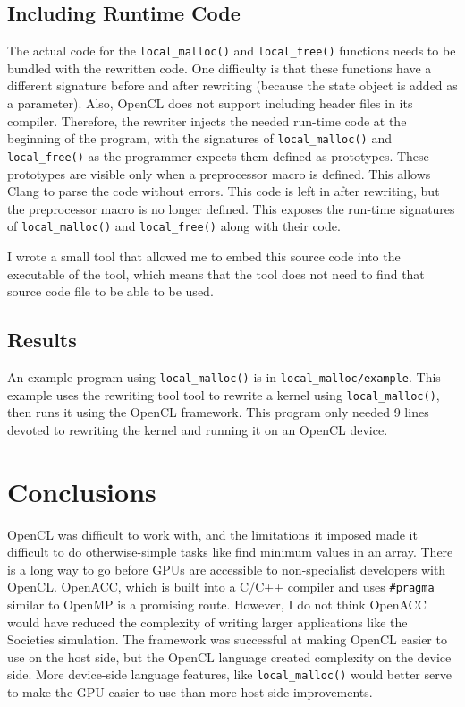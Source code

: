\documentclass{article}
\begin{document}
\subsection{Including Runtime Code}
The actual code for the \texttt{local\_malloc()} and \texttt{local\_free()} functions needs to be bundled with the rewritten code. One difficulty is that these functions have a different signature before and after rewriting (because the state object is added as a parameter). Also, OpenCL does not support including header files in its compiler. Therefore, the rewriter injects the needed run-time code at the beginning of the program, with the signatures of \texttt{local\_malloc()} and \texttt{local\_free()} as the programmer expects them defined as prototypes. These prototypes are visible only when a preprocessor macro is defined. This allows Clang to parse the code without errors. This code is left in after rewriting, but the preprocessor macro is no longer defined. This exposes the run-time signatures of \texttt{local\_malloc()} and \texttt{local\_free()} along with their code.

I wrote a small tool that allowed me to embed this source code into the executable of the tool, which means that the tool does not need to find that source code file to be able to be used.

\subsection{Results}
An example program using \texttt{local\_malloc()} is in \texttt{local\_malloc/example}. This example uses the rewriting tool tool to rewrite a kernel using \texttt{local\_malloc()}, then runs it using the OpenCL framework. This program only needed 9 lines devoted to rewriting the kernel and running it on an OpenCL device.

\section{Conclusions}
OpenCL was difficult to work with, and the limitations it imposed made it difficult to do otherwise-simple tasks like find minimum values in an array. There is a long way to go before GPUs are accessible to non-specialist developers with OpenCL. OpenACC, which is built into a C/C++ compiler and uses \texttt{\#pragma} similar to OpenMP is a promising route. However, I do not think OpenACC would have reduced the complexity of writing larger applications like the Societies simulation. The framework was successful at making OpenCL easier to use on the host side, but the OpenCL language created complexity on the device side. More device-side language features, like \texttt{local\_malloc()} would better serve to make the GPU easier to use than more host-side improvements.
\end{document}
